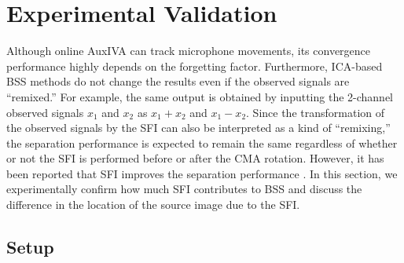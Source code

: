\documentclass[sip,biber]{now-journal}
\begin{document}
\section{Experimental Validation}\label{sec:experiment}

Although online AuxIVA can track microphone movements, its convergence performance highly depends on the forgetting factor.
Furthermore, ICA-based BSS methods do not change the results even if the observed signals are ``remixed.''
For example, the same output is obtained by inputting the 2-channel observed signals $x_1$ and $x_2$ as $x_1 + x_2$ and $x_1 - x_2$.
Since the transformation of the observed signals by the SFI can also be interpreted as a kind of ``remixing,''
the separation performance is expected to remain the same regardless of whether or not the SFI is performed before or after the CMA rotation.
However, it has been reported that SFI improves the separation performance \cite{Nakashima:2022:ASJ:A}.
In this section, we experimentally confirm how much SFI contributes to BSS and discuss the difference in the location of the source image due to the SFI.

\subsection{Setup}
\end{document}
